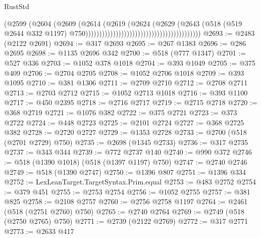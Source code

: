 \begin{lexlean}{RustStd}
\begin{coremodule}
                                                                      (@2599
                                                                        (@2604
                                                                          (@2609
                                                                            (@2614
                                                                              (@2619
                                                                                (@2624
                                                                                  (@2629
                                                                                    (@2643
                                                                                      (@518
                                                                                        (@519
                                                                                          @2644
                                                                                          @332
                                                                                          @1197)
                                                                                        @750))))))))))))))))))))))))))))))))))))))))))
@2693 := @2483 (@2122 @2691)
@2694 := @317 @2693
@2695 := @267 @1383
@2696 := @286 @2695
@2698 := @1135 @2696 @342
@2700 := @518 (@777 @1347)
@2701 := @527 @336
@2703 := @1052 @378 @1018
@2704 := @393 @1049
@2705 := @375 @409
@2706 := @2704 @2705
@2708 := @1052 @2706 @1018
@2709 := @393 @1095
@2710 := @381 @1306
@2711 := @2709 @2710
@2712 := @2708 @2711
@2713 := @2703 @2712
@2715 := @1052 @2713 @1018
@2716 := @393 @1100
@2717 := @450 @2395
@2718 := @2716 @2717
@2719 := @2715 @2718
@2720 := @368 @2719
@2721 := @1076 @382
@2722 := @375 @2721
@2723 := @373 @2722
@2724 := @448 @2723
@2725 := @2101 @2724
@2727 := @368 @2725 @382
@2728 := @2720 @2727
@2729 := @1353 @2728
@2733 := @2700 (@518 (@2701 @2729) @750)
@2735 := @2698 (@1345 @2733)
@2736 := @317 @2735
@2737 := @343 @344
@2739 := @772 @2737 @140
@2740 := @990 @372
@2746 := @518 (@1390 @1018) (@518 (@1397 @1197) @750)
@2747 := @2740 @2746
@2749 := @518 (@1390 @2747)
@2750 := @1396 @807
@2751 := @1396 @334
@2752 := LexLeanTarget.TargetSyntax.Prim.equal
@2753 := @483 @2752
@2754 := @379 @451
@2755 := @2753 @2754
@2756 := @1052 @2755
@2757 := @381 @825
@2758 := @2108 @2757
@2760 := @2756 @2758 @1197
@2764 := @2461 (@518 (@2751 @2760) @750)
@2765 := @2740 @2764
@2769 := @2749 (@518 (@2750 @2765) @750)
@2771 := @2739 (@2122 @2769)
@2772 := @317 @2771
@2773 := @2633 @417

\end{coremodule}
\end{lexlean}
